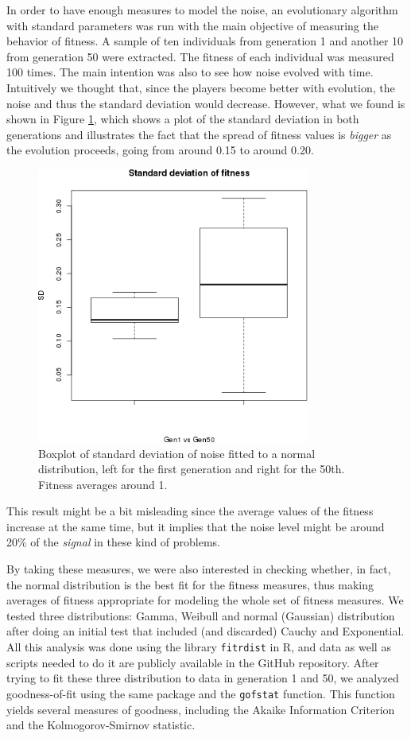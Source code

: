 \documentclass{llncs}
\begin{document}
In order to have enough measures to model the noise, an evolutionary algorithm with standard parameters was run with the
main objective of measuring the behavior of fitness. A sample of ten
individuals from generation 1 and another 10 from generation 50 were
extracted. The fitness of each individual was measured 100 times. 
The main intention was also to see how noise evolved with
time. Intuitively we thought that, since the players become better
with evolution, the noise and thus the standard deviation would
decrease. However, what we found is shown in Figure \ref{fig:sd},
which shows a plot of the standard deviation in both generations and
illustrates the fact that the spread of fitness values is {\em bigger}
as the evolution proceeds, going from around 0.15 to around 0.20. 
%
\begin{figure}[ht!b]
\centering
\includegraphics[width=0.8\textwidth]{../images/sd.png}
\caption{Boxplot of standard deviation of noise fitted to a normal
  distribution, left for the first generation and right for the
  50th. Fitness averages around 1. \label{fig:sd}}
\end{figure}
%
This result might be a bit misleading since the average values of
the fitness increase at the same time, but it implies that the noise
level might be around 20\% of the {\em signal} in these kind of problems. 

By taking these measures, we were also interested in checking whether, in fact, the normal
distribution is the best fit for the fitness measures, thus making
averages of fitness appropriate for modeling the whole set of fitness
measures. We tested three
distributions: Gamma, Weibull and normal (Gaussian) distribution after
doing an initial test that included (and discarded) Cauchy and Exponential. All this
analysis was done using the library {\tt fitrdist} in R, and data as
well as scripts needed to do it are publicly available in the GitHub repository. After trying
to fit these three distribution to data in generation 1 and 50, we
analyzed goodness-of-fit using the same package and the {\tt gofstat}
function. This function yields several measures of goodness, including
the Akaike Information Criterion and the Kolmogorov-Smirnov statistic.
\end{document}
